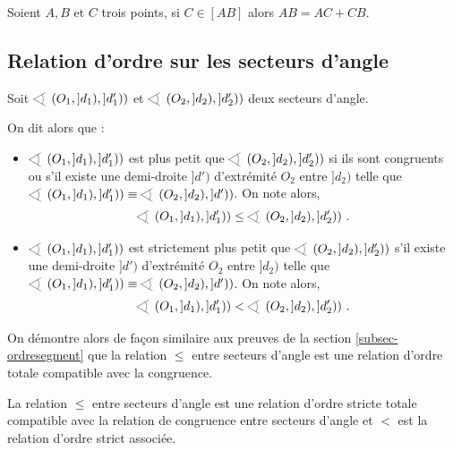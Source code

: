 \begin{prop}\label{prop-addlong}
    Soient $A,B$ et $C$ trois points, si $C\in [AB]$ alors $AB = AC + CB$.
\end{prop}

        \subsection{Relation d'ordre sur les secteurs d'angle}

\begin{defi}
    Soit $\anglesaillant\left(O_1,]d_1),]d_1')\right)$ et $\anglesaillant\left(O_2,]d_2),]d_2')\right)$ deux secteurs d'angle.

    On dit alors que :
    \begin{itemize}[$\bullet$]
        \item $\anglesaillant\left(O_1,]d_1),]d_1')\right)$ est plus petit que $\anglesaillant\left(O_2,]d_2),]d_2')\right)$ si ils sont congruents ou s'il existe une demi-droite $]d')$ d'extrémité $O_2$ entre $]d_2)$ telle que $\anglesaillant\left(O_1,]d_1),]d_1')\right) \equiv \anglesaillant\left(O_2,]d_2),]d')\right)$. On note alors,
        \begin{equation*}
            \anglesaillant\left(O_1,]d_1),]d_1')\right) \leq \anglesaillant\left(O_2,]d_2),]d_2')\right)\,.
        \end{equation*}
        \item $\anglesaillant\left(O_1,]d_1),]d_1')\right)$ est strictement plus petit que $\anglesaillant\left(O_2,]d_2),]d_2')\right)$ s'il existe une demi-droite $]d')$ d'extrémité $O_2$ entre $]d_2)$ telle que $\anglesaillant\left(O_1,]d_1),]d_1')\right) \equiv \anglesaillant\left(O_2,]d_2),]d')\right)$. On note alors,
        \begin{equation*}
            \anglesaillant\left(O_1,]d_1),]d_1')\right) < \anglesaillant\left(O_2,]d_2),]d_2')\right)\,.
        \end{equation*}
    \end{itemize}
\end{defi}
\begin{rema}
    On démontre alors de façon similaire aux preuves de la section \ref{subsec-ordresegment} que la relation $\leq$ entre secteurs d'angle est une relation d'ordre totale compatible avec la congruence.   
\end{rema}
\begin{thm}\label{thm-ineqsegmentrelationordre}
    La relation $\leq$ entre secteurs d'angle est une relation d'ordre stricte totale compatible avec la relation de congruence entre secteurs d'angle et $<$ est la relation d'ordre strict associée. 
\end{thm}

